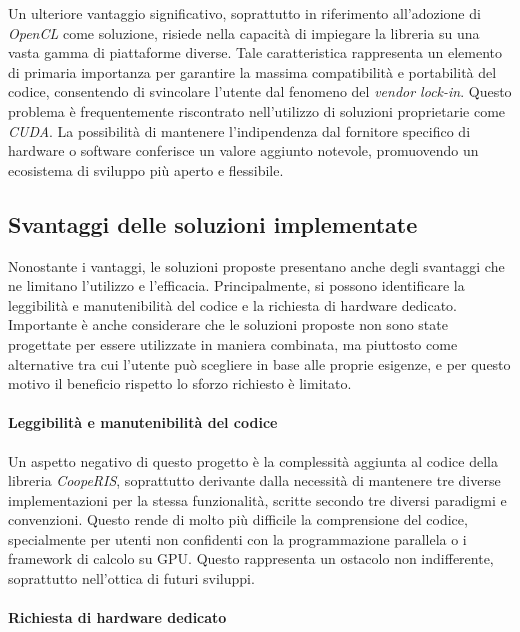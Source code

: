 Un ulteriore vantaggio significativo, soprattutto in riferimento all'adozione di
\textit{OpenCL} come soluzione, risiede nella capacità di impiegare la libreria su
una vasta gamma di piattaforme diverse. Tale caratteristica rappresenta un
elemento di primaria importanza per garantire la massima compatibilità e
portabilità del codice, consentendo di svincolare l'utente dal fenomeno del \textit{vendor
lock-in}. Questo problema è frequentemente riscontrato nell'utilizzo di soluzioni
proprietarie come \textit{CUDA}. La possibilità di mantenere l'indipendenza dal fornitore
specifico di hardware o software conferisce un valore aggiunto notevole,
promuovendo un ecosistema di sviluppo più aperto e flessibile.

\subsection{Svantaggi delle soluzioni implementate}
\label{sec:svantaggi}

Nonostante i vantaggi, le soluzioni proposte presentano anche degli svantaggi
che ne limitano l'utilizzo e l'efficacia. Principalmente, si possono
identificare la leggibilità e manutenibilità del codice e la richiesta di
hardware dedicato. Importante è anche considerare che le soluzioni proposte non sono
state progettate per essere utilizzate in maniera combinata, ma piuttosto come
alternative tra cui l'utente può scegliere in base alle proprie esigenze, e per questo
motivo il beneficio rispetto lo sforzo richiesto è limitato.

\paragraph{Leggibilità e manutenibilità del codice}
\label{para:leggibilita}

Un aspetto negativo di questo progetto è la complessità aggiunta al codice della
libreria \textit{CoopeRIS}, soprattutto derivante dalla necessità di mantenere tre
diverse implementazioni per la stessa funzionalità, scritte secondo tre diversi
paradigmi e convenzioni. Questo rende di molto più difficile la comprensione del
codice, specialmente per utenti non confidenti con la programmazione parallela o
i framework di calcolo su GPU. Questo rappresenta un ostacolo non indifferente,
soprattutto nell'ottica di futuri sviluppi.

\paragraph{Richiesta di hardware dedicato}
\label{para:hardware}

